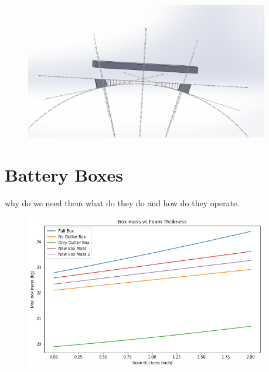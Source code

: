\begin{figure}
    \begin{small}
        \begin{center}
            \includegraphics[width=0.95\textwidth]{Hardware/figs/baffle_mount.png}
        \end{center}
        \caption{}
        \label{fig:}
    \end{small}
\end{figure}


\section{Battery Boxes}
why do we need them what do they do and how do they operate.

\begin{figure}
    \begin{small}
        \begin{center}
            \includegraphics[width=0.95\textwidth]{Hardware/figs/battery_box_mass.png}
        \end{center}
        \caption{}
        \label{fig:}
    \end{small}
\end{figure}


